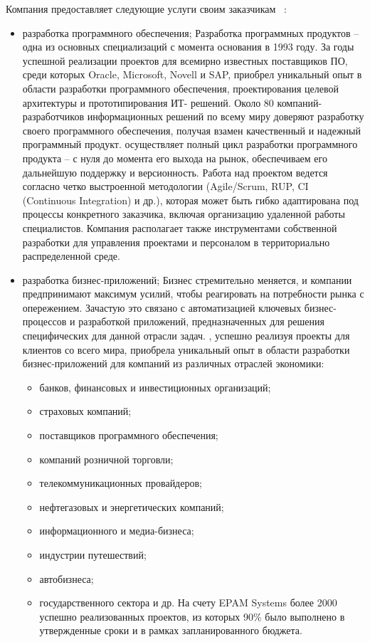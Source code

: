Компания предоставляет следующие услуги своим заказчикам~
\cite{epam_2016}:
\begin{itemize}
  \item разработка программного обеспечения;
  Разработка программных продуктов – одна из основных специализаций \company{} с момента основания в 1993 году. За годы успешной реализации проектов для всемирно известных поставщиков ПО, среди которых Oracle, Microsoft, Novell и SAP, \company{} приобрел уникальный опыт в области разработки программного обеспечения, проектирования целевой архитектуры и прототипирования ИТ- решений.
  Около 80 компаний-разработчиков информационных решений по всему миру доверяют \company{} разработку своего программного обеспечения, получая взамен качественный и надежный программный продукт.
  \company{} осуществляет полный цикл разработки программного продукта – с нуля до момента его выхода на рынок, обеспечиваем его дальнейшую поддержку и версионность. Работа над проектом ведется согласно четко выстроенной методологии (Agile/Scrum, RUP, CI (Continuous Integration) и др.), которая может быть гибко адаптирована под процессы конкретного заказчика, включая организацию удаленной работы специалистов. Компания располагает также инструментами собственной разработки для управления проектами и персоналом в территориально распределенной среде.

  \item разработка бизнес-приложений;
  Бизнес стремительно меняется, и компании предпринимают максимум усилий, чтобы реагировать на потребности рынка с опережением. Зачастую это связано с автоматизацией ключевых бизнес-процессов и разработкой приложений, предназначенных для решения специфических для данной отрасли задач. \company{}, успешно реализуя проекты для клиентов со всего мира, приобрела уникальный опыт в области разработки бизнес-приложений для компаний из различных отраслей экономики:
  \begin{itemize}
    \item банков, финансовых и инвестиционных организаций;
    \item страховых компаний;
    \item поставщиков программного обеспечения;
    \item компаний розничной торговли;
    \item телекоммуникационных провайдеров;
    \item нефтегазовых и энергетических компаний;
    \item информационного и медиа-бизнеса;
    \item индустрии путешествий;
    \item автобизнеса;
    \item государственного сектора и др.
        На счету EPAM Systems более 2000 успешно реализованных проектов, из которых 90\% было выполнено в утвержденные сроки и в рамках запланированного бюджета.
  \end{itemize}


\end{itemize}
